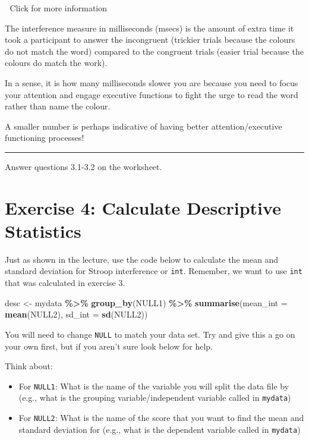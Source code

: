 \documentclass[
]{book}
\newenvironment{Shaded}{\begin{snugshade}}{\end{snugshade}}
\newcommand{\AttributeTok}[1]{\textcolor[rgb]{0.13,0.29,0.53}{#1}}
\newcommand{\FunctionTok}[1]{\textcolor[rgb]{0.13,0.29,0.53}{\textbf{#1}}}
\newcommand{\NormalTok}[1]{#1}
\newcommand{\OtherTok}[1]{\textcolor[rgb]{0.56,0.35,0.01}{#1}}
\newcommand{\SpecialCharTok}[1]{\textcolor[rgb]{0.81,0.36,0.00}{\textbf{#1}}}
\let\oldsection\section
\renewcommand{\section}{\needspace{5\baselineskip}\oldsection}
\begin{document}
👀 Click for more information

The interference measure in milliseconds (msecs) is the amount of extra time it took a participant to answer the incongruent (trickier trials because the colours do not match the word) compared to the congruent trials (easier trial because the colours do match the work).

In a sense, it is how many milliseconds slower you are because you need to focus your attention and engage executive functions to fight the urge to read the word rather than name the colour.

A smaller number is perhaps indicative of having better attention/executive functioning processes!

\begin{center}\rule{0.5\linewidth}{0.5pt}\end{center}

Answer questions 3.1-3.2 on the worksheet.

\section{Exercise 4: Calculate Descriptive Statistics}\label{exercise-4-calculate-descriptive-statistics}

Just as shown in the lecture, use the code below to calculate the mean and standard deviation for Stroop interference or \texttt{int}. Remember, we want to use \texttt{int} that was calculated in exercise 3.

\begin{Shaded}
\begin{Highlighting}[]
\NormalTok{desc }\OtherTok{\textless{}{-}}\NormalTok{  mydata }\SpecialCharTok{\%\textgreater{}\%}
  \FunctionTok{group\_by}\NormalTok{(NULL1) }\SpecialCharTok{\%\textgreater{}\%}
  \FunctionTok{summarise}\NormalTok{(}\AttributeTok{mean\_int =} \FunctionTok{mean}\NormalTok{(NULL2),}
            \AttributeTok{sd\_int =} \FunctionTok{sd}\NormalTok{(NULL2))}
\end{Highlighting}
\end{Shaded}

You will need to change \texttt{NULL} to match your data set. Try and give this a go on your own first, but if you aren't sure look below for help.

Think about:

\begin{itemize}
\item
  For \texttt{NULL1}: What is the name of the variable you will split the data file by (e.g., what is the grouping variable/independent variable called in \texttt{mydata})
\item
  For \texttt{NULL2}: What is the name of the score that you want to find the mean and standard deviation for (e.g., what is the dependent variable called in \texttt{mydata})
\end{itemize}
\end{document}
